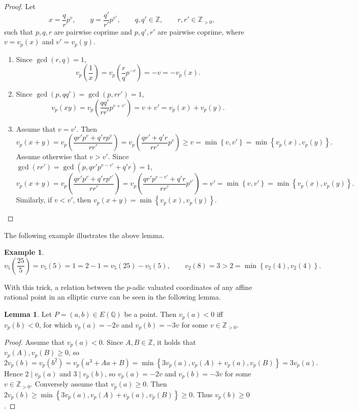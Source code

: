\documentclass{article}
\newcommand{\Z}{\mathbb{Z}}
\newcommand{\Q}{\mathbb{Q}}
\newcommand{\rb}[1]{\left( #1 \right)}
\newcommand{\cb}[1]{\left\{ #1 \right\}}
\theoremstyle{definition}
\newtheorem*{example}{Example}
\newtheorem{lemma}[proposition]{Lemma}
\begin{document}
\begin{proof}
Let
$$ x = \dfrac{q}{r}p^v, \qquad y = \dfrac{q'}{r'}p^{v'}, \qquad q, q' \in \Z, \qquad r, r' \in \Z_{> 0}, $$
such that $ p, q, r $ are pairwise coprime and $ p, q', r' $ are pairwise coprime, where $ v = v_p\rb{x} $ and $ v' = v_p\rb{y} $.
\begin{enumerate}
\item Since $ \gcd\rb{r, q} = 1 $,
$$ v_p\rb{\dfrac{1}{x}} = v_p\rb{\dfrac{r}{q}p^{-v}} = -v = -v_p\rb{x}. $$
\item Since $ \gcd\rb{p, qq'} = \gcd\rb{p, rr'} = 1 $,
$$ v_p\rb{xy} = v_p\rb{\dfrac{qq'}{rr'}p^{v + v'}} = v + v' = v_p\rb{x} + v_p\rb{y}. $$
\item Assume that $ v = v' $. Then
$$ v_p\rb{x + y} = v_p\rb{\dfrac{qr'p^v + q'rp^v}{rr'}} = v_p\rb{\dfrac{qr' + q'r}{rr'}p^v} \ge v = \min\cb{v, v'} = \min\cb{v_p\rb{x}, v_p\rb{y}}. $$
Assume otherwise that $ v > v' $. Since $ \gcd\rb{rr'} = \gcd\rb{p, qr'p^{v - v'} + q'r} = 1 $,
$$ v_p\rb{x + y} = v_p\rb{\dfrac{qr'p^v + q'rp^{v'}}{rr'}} = v_p\rb{\dfrac{qr'p^{v - v'} + q'r}{rr'}p^{v'}} = v' = \min\cb{v, v'} = \min\cb{v_p\rb{x}, v_p\rb{y}}. $$
Similarly, if $ v < v' $, then $ v_p\rb{x + y} = \min\cb{v_p\rb{x}, v_p\rb{y}} $.
\end{enumerate}
\end{proof}

The following example illustrates the above lemma.

\begin{example}
$$ v_5\rb{\dfrac{25}{5}} = v_5\rb{5} = 1 = 2 - 1 = v_5\rb{25} - v_5\rb{5}, \qquad v_2\rb{8} = 3 > 2 = \min\cb{v_2\rb{4}, v_2\rb{4}}. $$
\end{example}

With this trick, a relation between the $ p $-adic valuated coordinates of any affine rational point in an elliptic curve can be seen in the following lemma.

\begin{lemma}
Let $ P = \rb{a, b} \in E\rb{\Q} $ be a point. Then $ v_p\rb{a} < 0 $ iff $ v_p\rb{b} < 0 $, for which $ v_p\rb{a} = -2v $ and $ v_p\rb{b} = -3v $ for some $ v \in \Z_{> 0} $.
\end{lemma}

\begin{proof}
Assume that $ v_p\rb{a} < 0 $. Since $ A, B \in \Z $, it holds that $ v_p\rb{A}, v_p\rb{B} \ge 0 $, so
$$ 2v_p\rb{b} = v_p\rb{b^2} = v_p\rb{a^3 + Aa + B} = \min\cb{3v_p\rb{a}, v_p\rb{A} + v_p\rb{a}, v_p\rb{B}} = 3v_p\rb{a}. $$
Hence $ 2 \mid v_p\rb{a} $ and $ 3 \mid v_p\rb{b} $, so $ v_p\rb{a} = -2v $ and $ v_p\rb{b} = -3v $ for some $ v \in \Z_{> 0} $. Conversely assume that $ v_p\rb{a} \ge 0 $. Then $ 2v_p\rb{b} \ge \min\cb{3v_p\rb{a}, v_p\rb{A} + v_p\rb{a}, v_p\rb{B}} \ge 0 $. Thus $ v_p\rb{b} \ge 0 $.
\end{proof}
\end{document}
